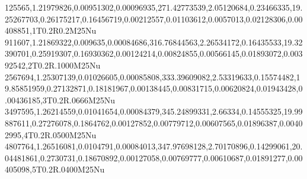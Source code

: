 125565,1.21979826,0.00951302,0.00096935,271.42773539,2.05120684,0.23466335,19.25267703,0.26175217,0.16456719,0.00212557,0.01103612,0.0057013,0.02128306,0.00408851,1T0.2R0.2M25Nu
911607,1.21869322,0.009635,0.00084686,316.76844563,2.26534172,0.16435533,19.32390701,0.25919307,0.16930362,0.00124214,0.00824855,0.00566145,0.01893072,0.00392542,2T0.2R.1000M25Nu
2567694,1.25307139,0.01026605,0.00085808,333.39609082,2.53319633,0.15574482,19.85851959,0.27132871,0.18181967,0.00138445,0.00831715,0.00620824,0.01943428,0.00436185,3T0.2R.0666M25Nu
3497595,1.26214559,0.01041654,0.00084379,345.24899331,2.66334,0.14555325,19.99887611,0.27276078,0.1864762,0.00127852,0.00779712,0.00607565,0.01896387,0.00402995,4T0.2R.0500M25Nu
4807764,1.26516081,0.0104791,0.00084013,347.97698128,2.70170896,0.14299061,20.04481861,0.2730731,0.18670892,0.00127058,0.00769777,0.00610687,0.01891277,0.00405098,5T0.2R.0400M25Nu
